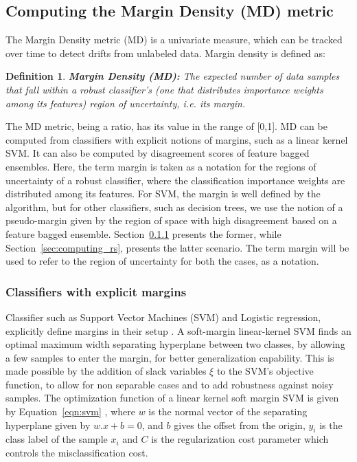 \documentclass[authoryear,3p,times,twocolumn]{elsarticle}
\begin{document}
\subsection{Computing the Margin Density (MD) metric}
\label{sec:computing}

The Margin Density metric (MD) is a univariate measure, which can be tracked over time to detect drifts from unlabeled data. Margin density is defined as:

\newtheorem{definition}{Definition}[]
\theoremstyle{definition}
\begin{definition}{\textbf{Margin Density (MD):}}
 The expected number of data samples that fall within a robust classifier's (one that distributes importance weights among its features)  region of uncertainty, i.e. its margin.
\end{definition}

The MD metric, being a ratio, has its value in the range of [0,1].  MD can be computed from classifiers with explicit notions of margins, such as a linear kernel SVM. It can also be computed by disagreement scores of feature bagged ensembles. Here, the term margin is taken as a notation for the regions of uncertainty of a robust classifier, where the classification importance weights are distributed among its features. For SVM, the margin is well defined by the algorithm, but for other classifiers, such as decision trees, we use the notion of a pseudo-margin given by the region of space with high disagreement based on a feature bagged ensemble. Section~\ref{sec:computing_svm} presents the former, while Section~\ref{sec:computing_rs}, presents the latter scenario. The term margin will be used to refer to the region of uncertainty for both the cases, as a notation.

\subsubsection{Classifiers with explicit margins}
\label{sec:computing_svm}

Classifier such as Support Vector Machines (SVM) and Logistic regression, explicitly define margins in their setup \citep{chang2011libsvm}. A soft-margin linear-kernel SVM finds an optimal maximum width separating hyperplane between two classes, by allowing a few samples to enter the margin, for better generalization capability. This is made possible by the addition of slack variables $\xi$ to the SVM's objective function, to allow for non separable cases and to add robustness against noisy samples. The optimization function of a linear kernel soft margin SVM is given by Equation~\ref{eqn:svm} \citep{chang2011libsvm}, where $w$ is the normal vector of the separating hyperplane given by $w.x+b=0$, and $b$ gives the offset from the origin, $y_i$ is the class label of the sample $x_i$ and $C$ is the regularization cost parameter which controls the misclassification cost. 
\end{document}
